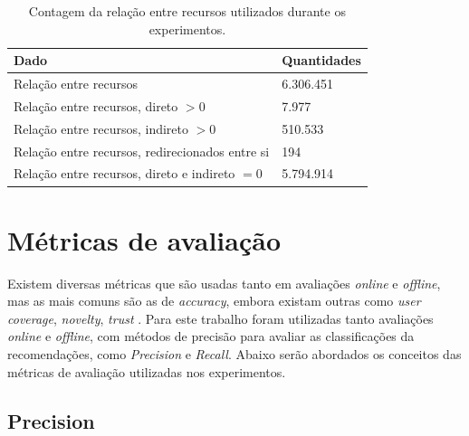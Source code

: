 \begin{table}[H]
\centering
\def\arraystretch{1.3}
\begin{tabular}{|l|l|}
\hline
\textbf{Dado}                                   & \textbf{Quantidades} \\ \hline
Relação entre recursos                          & 6.306.451            \\ \hline
Relação entre recursos, direto $> 0$ 			& 7.977                \\ \hline
Relação entre recursos, indireto $> 0$ 			& 510.533              \\ \hline
Relação entre recursos, redirecionados entre si & 194                  \\ \hline
Relação entre recursos, direto e indireto $= 0$ & 5.794.914            \\ \hline
\end{tabular}
\caption{Contagem da relação entre recursos utilizados durante os experimentos.}
\label{tab:lod_cache_stats}
\end{table}

\section{Métricas de avaliação}
\label{sec:av_metrics}

Existem diversas métricas que são usadas tanto em avaliações \textit{online} e \textit{offline}, mas as mais comuns são as de \textit{accuracy}, embora existam outras como \textit{user coverage}, \textit{novelty}, \textit{trust} \citep{Jannach:2010}. Para este trabalho foram utilizadas tanto avaliações \textit{online} e \textit{offline}, com métodos de precisão para avaliar as classificações da recomendações, como \textit{Precision} e \textit{Recall}. Abaixo serão abordados os conceitos das métricas de avaliação utilizadas nos experimentos.

\subsection{Precision}

